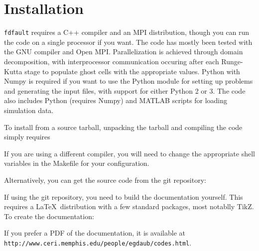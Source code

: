 \documentclass[12pt]{article}   	%
\begin{document}
\section{Installation}

{\tt fdfault} requires a C++ compiler and an MPI distribution, though you can run the code on a single processor if you want. The code has mostly been tested with the GNU compiler and Open MPI. Parallelization is achieved through domain decomposition, with interprocessor communication occuring after each Runge-Kutta stage to populate ghost cells with the appropriate values. Python with Numpy is required if you want to use the Python module for setting up problems and generating the input files, with support for either Python 2 or 3. The code also includes Python (requires Numpy) and MATLAB scripts for loading simulation data.

To install from a source tarball, unpacking the tarball and compiling the code simply requires

\vspace{0.1in}

\vspace{0.1in}
\noindent If you are using a different compiler, you will need to change the appropriate shell variables in the Makefile for your configuration.

Alternatively, you can get the source code from the git repository:

\vspace{0.1in}

\vspace{0.1in}
If using the git repository, you need to build the documentation yourself. This requires a \LaTeX\ distribution with a few standard packages, most notablly TikZ. To create the documentation:

\vspace{0.1in}

\vspace{0.1in}
\noindent If you prefer a PDF of the documentation, it is available at \\
{\tt http://www.ceri.memphis.edu/people/egdaub/codes.html}.
\end{document}
